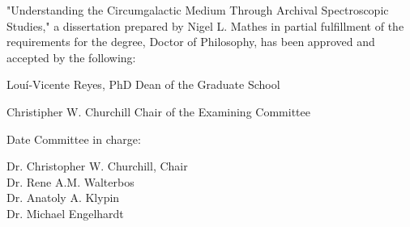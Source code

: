 \noindent "Understanding the Circumgalactic Medium Through Archival Spectroscopic Studies," a dissertation prepared by Nigel L. Mathes in partial fulfillment of the requirements for the degree, Doctor of Philosophy, has been approved and accepted by the following:

\singlespace

\bigskip
\begin{flushleft}
\hrulefill
\newline
Louí-Vicente Reyes, PhD
\newline
Dean of the Graduate School

\vspace{0.5in}

\hrulefill
\newline
Christipher W. Churchill
\newline
Chair of the Examining Committee

\vspace{0.5in}

\hrulefill
\newline
Date
\vspace{0.5in}
\newline
Committee in charge:
\end{flushleft}

\doublespace

\indent Dr. Christopher W. Churchill, Chair\\
\indent Dr. Rene A.M. Walterbos\\
\indent Dr. Anatoly A. Klypin\\
\indent Dr. Michael Engelhardt\\

